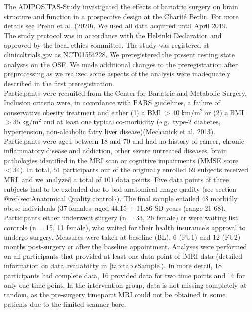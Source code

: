 \documentclass[
]{article}
\begin{document}
The ADIPOSITAS-Study investigated the effects of bariatric surgery on brain structure and function in a prospective design at the Charité Berlin. For more details see Prehn et al. (2020). We used all data acquired until April 2019.\\
The study protocol was in accordance with the Helsinki Declaration and approved by the local ethics committee. The study was registered at clinicaltrials.gov as NCT01554228. We preregistered the present resting state analyses on the \href{https://osf.io/yp42s}{OSF}. We made \href{https://osf.io/59bh7/}{additional changes} to the preregistration after preprocessing as we realized some aspects of the analysis were inadequately described in the first preregistration.\\
Participants were recruited from the Center for Bariatric and Metabolic Surgery. Inclusion criteria were, in accordance with BARS guidelines, a failure of conservative obesity treatment and either (1) a BMI \(> 40\) km/m\(^2\) or (2) a BMI \(> 35\) kg/m\(^2\) and at least one typical co-morbidity (e.g.~type-2 diabetes, hypertension, non-alcoholic fatty liver disease)(Mechanick et al. 2013).
Participants were aged between \(18\) and \(70\) and had no history of cancer, chronic inflammatory disease and addiction, other severe untreated diseases, brain pathologies identified in the MRI scan or cognitive impairments (MMSE score \(< 34\)).
In total, \(51\) participants out of the originally enrolled \(69\) subjects received MRI, and we analyzed a total of \(101\) data points. Five data points of three subjects had to be excluded due to bad anatomical image quality (see section @ref\{sec:Anatomical Quality control\}).
The final sample entailed 48 morbidly obese individuals (37 females; aged 44.15 \(\pm\) 11.86 SD years (range 21-68). Participants either underwent surgery (n = 33, 26 female) or were waiting list controls (n = 15, 11 female), who waited for their health insurance's approval to undergo surgery. Measures were taken at baseline (BL), \(6\) (FU1) and \(12\) (FU2) months post-surgery or after the baseline appointment. Analyses were performed on all participants that provided at least one data point of fMRI data (detailed information on data availability in \ref{tab:tableSample}). In more detail, 18 participants had complete data, 16 provided data for two time points and 14 for only one time point. In the intervention group, data is not missing completely at random, as the pre-surgery timepoint MRI could not be obtained in some patients due to the limited scanner bore.
\end{document}
